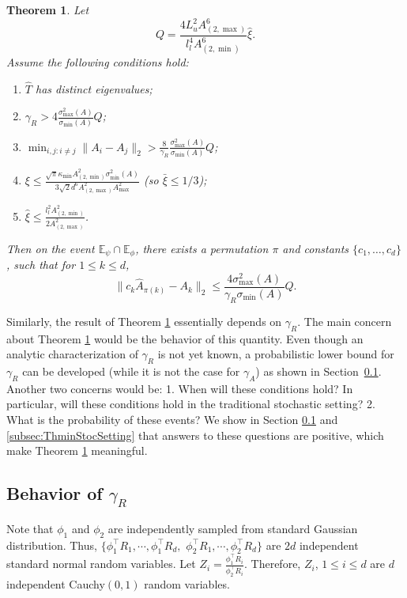\documentclass[twoside]{article}
\newcommand{\Epsi}{\mathbb{E}_{\psi}}
\newcommand{\Ephi}{\mathbb{E}_{\phi}}
\newtheorem{thm}[lemma]{Theorem}
\theoremstyle{definition}
\begin{document}
\begin{thm}
\label{thm:Modefficiency}
Let 
 \[ 
 Q=  
 \frac{4L_u^2A^6_{(2,\max)}}{l_l^4 A^6_{(2,\min)}}\widehat{\xi}.
 \] 
 Assume the following conditions hold:
 \begin{enumerate}
 \item $\widehat{T}$ has distinct eigenvalues;
 \item $\gamma_R > 4 \frac{\sigma_{\max}^2(A)}{\sigma_{\min}(A) }Q$; 
 \item $\min_{i,j:i\neq j} \|A_i - A_j\|_2 > \frac{8}{\gamma_R}\frac{\sigma_{\max}^2(A)}{\sigma_{\min}(A) } Q$;
 \item $\xi \le \frac{\sqrt{\pi}\kappa_{\min}A^2_{(2,\min)}\sigma_{\min}^2(A)}{3\sqrt{2}d^6A_{(2,\max)}^2A_{\max}^2}$
 (so $\bar{\xi} \le 1/3$);
 \item $\widehat{\xi} \le \frac{l_l^2 A^2_{(2,\min)}}{2A^2_{(2,\max)}}$.
 \end{enumerate}
Then on the event $\Epsi \cap\Ephi$, there exists a permutation $\pi$ and constants $\{c_1,\ldots,c_d\}$, such that for $1\le k\le d$,
\[
\| c_k\widehat{A}_{\pi(k)} - A_k\|_2 \le \frac{4\sigma^2_{\max}(A)}{\gamma_R\sigma_{\min}(A)} Q.
\]
\end{thm}

Similarly, the result of Theorem \ref{thm:Modefficiency} essentially depends on $\gamma_R$. 
The main concern about Theorem \ref{thm:Modefficiency} would be the behavior of this quantity. 
Even though an analytic characterization of $\gamma_R$ is not yet known, a probabilistic lower bound for $\gamma_R$ can be developed (while it is not the case for $\gamma_A$) as shown in Section~\ref{subsec:gammaR}.
Another two concerns would be: 1. When will these conditions hold? In particular, will these conditions hold in the traditional stochastic setting? 2. What is the probability of these events?
We show in Section \ref{subsec:gammaR} and \ref{subsec:ThminStocSetting} that answers to these questions are positive, which make Theorem \ref{thm:Modefficiency} meaningful.

\subsection{Behavior of $\gamma_R$}
\label{subsec:gammaR}
Note that $\phi_1$ and $\phi_2$ are independently sampled from standard Gaussian distribution. 
Thus, $\{\phi_1^{\top}R_1, \cdots, \phi_1^{\top}R_d,$ $\phi_2^{\top}R_1, \cdots, \phi_2^{\top}R_d\}$ are $2d$ independent standard normal random variables. 
Let $Z_i = \frac{\phi_1^{\top}R_i}{\phi_2^{\top}R_i}$. Therefore, $Z_i$, $1\le i\le d$ are $d$ independent Cauchy$(0,1)$ random variables. 
\end{document}
